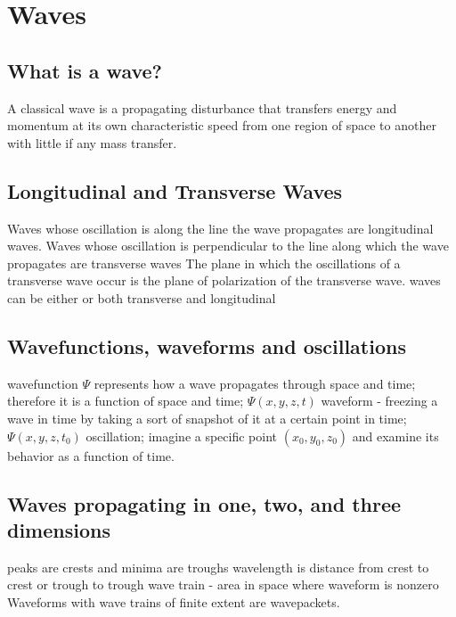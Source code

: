 \documentclass{article}
\begin{document}
\section{Waves}
\subsection{What is a wave?}
\begin{outline}
    \1 A classical wave is a propagating disturbance that transfers energy and momentum at its own characteristic speed from one region of space to another with little if any mass transfer.
\end{outline}
\subsection{Longitudinal and Transverse Waves}
\begin{outline}
    \1 Waves whose oscillation is along the line the wave propagates are longitudinal waves. 
    \1 Waves whose oscillation is perpendicular to the line along which the wave propagates are transverse waves
    \1 The plane in which the oscillations of a transverse wave occur is the plane of polarization of the transverse wave. 
    \1 waves can be either or both transverse and longitudinal
\end{outline}
\subsection{Wavefunctions, waveforms and oscillations}
\begin{outline}
    \1 wavefunction $\Psi$ represents how a wave propagates through space and time; therefore it is a function of space and time; \(\Psi(x,y,z,t)\)
    \1 waveform - freezing a wave in time by taking a sort of snapshot of it at a certain point in time; \(\Psi(x,y,z,t_0)\)
    \1 oscillation; imagine a specific point \((x_0,y_0,z_0)\) and examine its behavior as a function of time. 
\end{outline}
\subsection{Waves propagating in one, two, and three dimensions}
\begin{outline}
    \1 peaks are crests and minima are troughs
    \1 wavelength is distance from crest to crest or trough to trough
    \1 wave train - area in space where waveform is nonzero
    \1 Waveforms with wave trains of finite extent are wavepackets. 
\end{outline}
\end{document}

